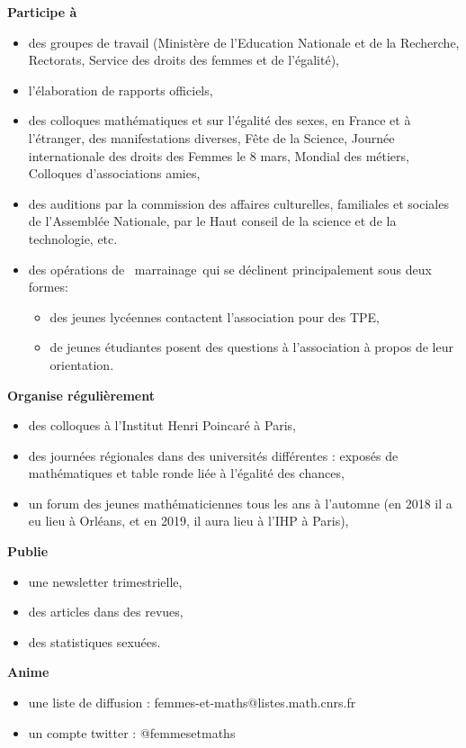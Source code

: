 \textbf{Participe \`a}
\begin{itemize}
\item des groupes de travail (Minist\`ere de l'Education Nationale et de la Recherche, Rectorats, Service des droits des femmes et de l'\'egalit\'e),
\item l'\'elaboration de rapports officiels,
\item des colloques math\'ematiques et sur l'\'egalit\'e des sexes, en France et \`a l'\'etranger,
 des manifestations diverses, F\^ete de la Science, Journ\'ee internationale des droits des Femmes le 8 mars, Mondial des m\'etiers, Colloques d'associations amies,
\item des auditions par la commission des affaires culturelles, familiales et sociales de l'Assembl\'ee Nationale, par le Haut conseil de la science et de la technologie, etc.
\item  des op\'erations de \og\ marrainage\fg\  qui se d\'eclinent principalement sous deux formes:
\begin{itemize}
\item des jeunes lyc\'eennes contactent l'association pour des TPE,
\item de jeunes \'etudiantes posent des questions \`a l'association \`a propos de leur orientation.
\end{itemize}
\end{itemize}
\textbf{Organise r\'eguli\`erement}
\begin{itemize}
\item des colloques \`a l'Institut Henri Poincar\'e \`a Paris,
\item des journ\'ees r\'egionales dans des universit\'es diff\'erentes : expos\'es de math\'ematiques et table ronde li\'ee \`a l'\'egalit\'e des chances,
\item un forum des jeunes math\'ematicien\mp nes tous les ans \`a l'automne (en 2018 il a eu lieu à Orléans, et en 2019, il aura lieu à l'IHP à Paris),
\end{itemize}
\textbf{Publie}
\begin{itemize}
\item une newsletter trimestrielle,
\item des articles dans des revues,
\item des statistiques sexu\'ees.
\end{itemize}
\textbf{Anime}
\begin{itemize}
\item
une liste de diffusion : femmes-et-maths@listes.math.cnrs.fr
\item
un compte twitter : @femmesetmaths
\end{itemize}


